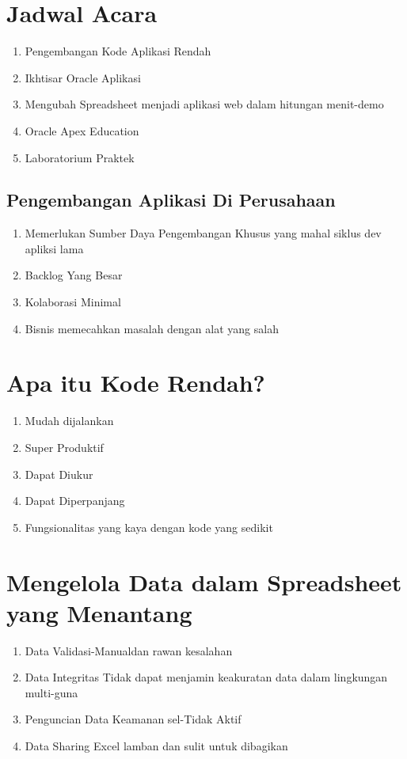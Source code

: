 \documentclass{article}
\begin{document}
\section{Jadwal Acara}
    \begin{enumerate}
        \item Pengembangan Kode Aplikasi Rendah
        \item Ikhtisar Oracle Aplikasi
        \item Mengubah Spreadsheet menjadi aplikasi web dalam hitungan menit-demo
        \item Oracle Apex Education
        \item Laboratorium Praktek
    \end{enumerate}
\subsection{Pengembangan Aplikasi Di Perusahaan}
     \begin{enumerate}
         \item Memerlukan Sumber Daya Pengembangan Khusus yang mahal siklus dev apliksi lama
         \item Backlog Yang Besar
         \item Kolaborasi Minimal
         \item Bisnis memecahkan masalah dengan alat yang salah
     \end{enumerate}
\section{Apa itu Kode Rendah?}
      \begin{enumerate}
          \item Mudah dijalankan
          \item Super Produktif
          \item Dapat Diukur
          \item Dapat Diperpanjang
          \item Fungsionalitas yang kaya dengan kode yang sedikit
      \end{enumerate}
\section{Mengelola Data dalam Spreadsheet yang Menantang}
      \begin{enumerate}
          \item Data Validasi-Manualdan rawan kesalahan
          \item Data Integritas Tidak dapat menjamin keakuratan data dalam lingkungan multi-guna
          \item Penguncian Data Keamanan sel-Tidak Aktif
          \item Data Sharing Excel lamban dan sulit untuk dibagikan
          
      \end{enumerate}
\end{document}
